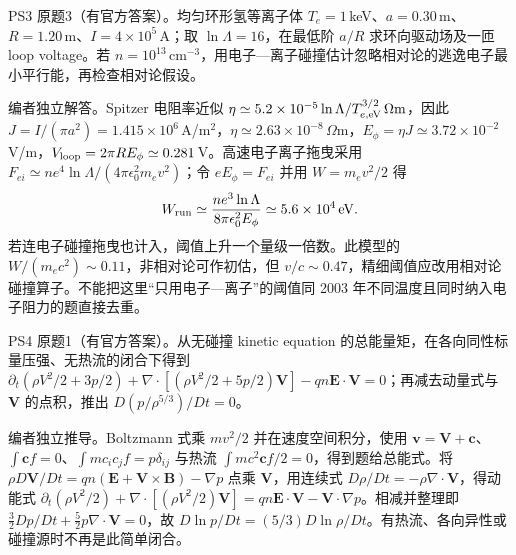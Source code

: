 \begin{exercise}\label{ex:hist02-3-3}
PS3 原题3（有官方答案）。均匀环形氢等离子体 $T_e=1\,$keV、$a=0.30\,$m、$R=1.20\,$m、$I=4\times10^5\,$A；取 $\ln\Lambda=16$，在最低阶 $a/R$ 求环向驱动场及一匝 loop voltage。若 $n=10^{13}\,\mathrm{cm^{-3}}$，用电子—离子碰撞估计忽略相对论的逃逸电子最小平行能，再检查相对论假设。
\end{exercise}
\begin{solution}
编者独立解答。Spitzer 电阻率近似 $\eta\simeq5.2\times10^{-5}\ln\Lambda/T_{e,\rm eV}^{3/2}\,\Omega\mathrm m$，因此 $J=I/(\pi a^2)=1.415\times10^6\,$A/m$^2$，$\eta\simeq2.63\times10^{-8}\,\Omega\mathrm m$，$E_\phi=\eta J\simeq3.72\times10^{-2}\,$V/m，$V_{\rm loop}=2\pi RE_\phi\simeq0.281\,$V。高速电子离子拖曳采用 $F_{ei}\simeq ne^4\ln\Lambda/(4\pi\epsilon_0^2m_ev^2)$；令 $eE_\phi=F_{ei}$ 并用 $W=m_ev^2/2$ 得
\begin{equation}W_{\rm run}\simeq\frac{ne^3\ln\Lambda}{8\pi\epsilon_0^2E_\phi}\simeq5.6\times10^4\,\mathrm{eV}.
\end{equation}
若连电子碰撞拖曳也计入，阈值上升一个量级一倍数。此模型的 $W/(m_ec^2)\sim0.11$，非相对论可作初估，但 $v/c\sim0.47$，精细阈值应改用相对论碰撞算子。不能把这里“只用电子—离子”的阈值同 2003 年不同温度且同时纳入电子阻力的题直接去重。
\end{solution}

\begin{exercise}\label{ex:hist02-4-1}
PS4 原题1（有官方答案）。从无碰撞 kinetic equation 的总能量矩，在各向同性标量压强、无热流的闭合下得到 $\partial_t(\rho V^2/2+3p/2)+\nabla\cdot[(\rho V^2/2+5p/2)\mathbf V]-qn\mathbf E\cdot\mathbf V=0$；再减去动量式与 $\mathbf V$ 的点积，推出 $D(p/\rho^{5/3})/Dt=0$。
\end{exercise}
\begin{solution}
编者独立推导。Boltzmann 式乘 $mv^2/2$ 并在速度空间积分，使用 $\mathbf v=\mathbf V+\mathbf c$、$\int\mathbf c f=0$、$\int m c_ic_jf=p\delta_{ij}$ 与热流 $\int mc^2\mathbf c f/2=0$，得到题给总能式。将 $\rho D\mathbf V/Dt=qn(\mathbf E+\mathbf V\times\mathbf B)-\nabla p$ 点乘 $\mathbf V$，用连续式 $D\rho/Dt=-\rho\nabla\cdot\mathbf V$，得动能式 $\partial_t(\rho V^2/2)+\nabla\cdot[(\rho V^2/2)\mathbf V]=qn\mathbf E\cdot\mathbf V-\mathbf V\cdot\nabla p$。相减并整理即 $\frac32Dp/Dt+\frac52p\nabla\cdot\mathbf V=0$，故 $D\ln p/Dt=(5/3)D\ln\rho/Dt$。有热流、各向异性或碰撞源时不再是此简单闭合。
\end{solution}

